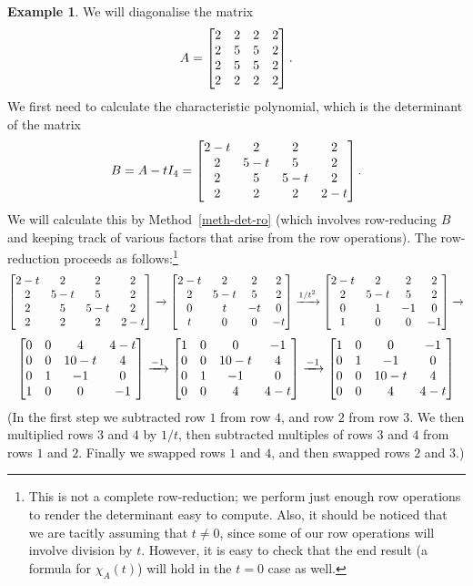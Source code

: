 \documentclass[reqno]{amsart}
\theoremstyle{definition}
\newtheorem{example}[theorem]{Example}
\begin{document}
\begin{example}\label{eg-diag-v}
 We will diagonalise the matrix
 \[ A = \left[\begin{matrix} 2&2&2&2 \\ 2&5&5&2 \\ 2&5&5&2 \\ 2&2&2&2 \end{matrix}\right]. \]
 We first need to calculate the characteristic polynomial, which is
 the determinant of the matrix
 \[ B = A-tI_4 = 
      \left[\begin{matrix} 2-t&2&2&2 \\ 2&5-t&5&2 \\ 2&5&5-t&2 \\ 2&2&2&2-t \end{matrix}\right].
 \]
 We will calculate this by Method~\ref{meth-det-ro} (which involves
 row-reducing $B$ and keeping track of various factors that arise from
 the row operations).  The row-reduction proceeds as follows:\footnote{%
 This is not a complete row-reduction; we perform just enough
 row operations to render the determinant easy to compute.
 Also, it should be noticed that we are tacitly assuming that
 $t \neq 0$, since some of our row operations will involve
 division by $t$.  However, it is easy to check that the
 end result (a formula for $\chi_A(t)$) will hold in the
 $t = 0$ case as well.}
 \[
    \left[\begin{matrix} 2-t & 2   & 2   & 2 \\
         2   & 5-t & 5   & 2 \\
         2   & 5   & 5-t & 2 \\
         2   & 2   & 2   & 2-t \end{matrix}\right]
    \xrightarrow{}
    \left[\begin{matrix} 2-t & 2   & 2   & 2 \\
         2   & 5-t & 5   & 2 \\
         0   & t   & -t  & 0 \\
         t   & 0   & 0   & -t \end{matrix}\right]
    \xrightarrow{1/t^2}
    \left[\begin{matrix} 2-t & 2   & 2   & 2 \\
         2   & 5-t & 5   & 2 \\
         0   & 1   & -1  & 0 \\
         1   & 0   & 0   & -1 \end{matrix}\right]
    \xrightarrow{}
 \] \[
    \left[\begin{matrix} 0   & 0   & 4    & 4-t \\
         0   & 0   & 10-t & 4 \\
         0   & 1   & -1   & 0 \\
         1   & 0   & 0    & -1 \end{matrix}\right]
    \xrightarrow{-1}
    \left[\begin{matrix} 1   & 0   & 0    & -1 \\
         0   & 0   & 10-t & 4 \\
         0   & 1   & -1   & 0 \\
         0   & 0   & 4    & 4-t \end{matrix}\right]
    \xrightarrow{-1}
    \left[\begin{matrix} 1   & 0   & 0    & -1 \\
         0   & 1   & -1   & 0 \\
         0   & 0   & 10-t & 4 \\
         0   & 0   & 4    & 4-t \end{matrix}\right]         
 \]
 (In the first step we subtracted row $1$ from row $4$, and row $2$
 from row $3$.  We then multiplied rows $3$ and $4$ by $1/t$, then
 subtracted multiples of rows $3$ and $4$ from rows $1$ and $2$.
 Finally we swapped rows $1$ and $4$, and then swapped rows $2$ and
 $3$.) 


\end{example}
\end{document}
